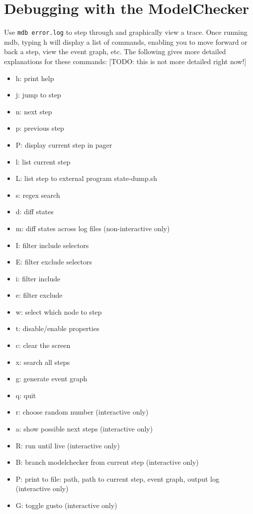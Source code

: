\documentclass[12pt,letterpaper]{article}
\begin{document}
\section{Debugging with the ModelChecker}
\label{DebuggingMC}
Use \texttt{mdb error.log} to step through and graphically view a trace.  Once running mdb, typing h will display a list of commands, enabling you to move forward or back a step, view the event graph, etc. The following gives more detailed explanations for these commands:
[TODO: this is not more detailed right now!]
\begin{itemize}
\item h: print help
\item j: jump to step
\item n: next step
\item p: previous step
\item P: display current step in pager
\item l: list current step
\item L: list step to external program state-dump.sh
\item s: regex search
\item d: diff states
\item m: diff states across log files (non-interactive only)
\item I: filter include selectors
\item E: filter exclude selectors
\item i: filter include
\item e: filter exclude
\item w: select which node to step
\item t: disable/enable properties
\item c: clear the screen
\item x: search all steps
\item g: generate event graph
\item q: quit
\item r: choose random number (interactive only)
\item a: show possible next steps (interactive only)
\item R: run until live (interactive only)
\item B: branch modelchecker from current step (interactive only)
\item P: print to file: path, path to current step, event graph, output log (interactive only)
\item G: toggle gusto (interactive only)
\end{itemize}
\end{document}
